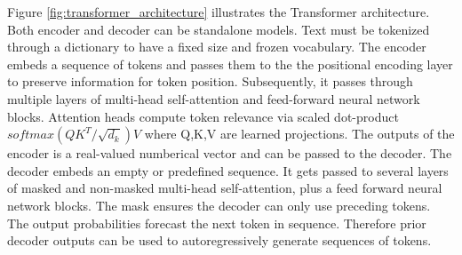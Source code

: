 Figure \ref{fig:transformer_architecture} illustrates the Transformer architecture. Both encoder and decoder can be standalone models. Text must be tokenized through a dictionary to have a fixed size and frozen vocabulary.
The encoder embeds a sequence of tokens and passes them to the the positional encoding layer to preserve information for token position. Subsequently, it passes through multiple layers of multi-head self-attention and feed-forward neural network blocks. Attention heads compute token relevance via scaled dot-product
$softmax(QK^T/\sqrt{d_k})V$ where Q,K,V are learned projections. The outputs of the encoder is a real-valued numberical vector and can be passed to the decoder.
The decoder embeds an empty or predefined sequence. It gets passed to several layers of masked and non-masked multi-head self-attention, plus a feed forward neural network blocks. The mask ensures the decoder can only use preceding tokens. The output probabilities forecast the next token in sequence. Therefore prior decoder outputs can be used to autoregressively generate sequences of tokens.





